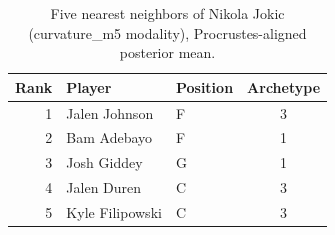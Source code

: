 \begin{table}[htbp]
  \centering\small
  \begin{tabular}{rllc}
    \toprule
    Rank & Player & Position & Archetype \\
    \midrule
    1 & Jalen Johnson & F & 3 \\
    2 & Bam Adebayo & F & 1 \\
    3 & Josh Giddey & G & 1 \\
    4 & Jalen Duren & C & 3 \\
    5 & Kyle Filipowski & C & 3 \\
    \bottomrule
  \end{tabular}
  \caption{Five nearest neighbors of Nikola Jokic (curvature_m5 modality), Procrustes-aligned posterior mean.}
  \label{tab:Nikola_Jokic_neighbors_curvature_m5}
\end{table}

